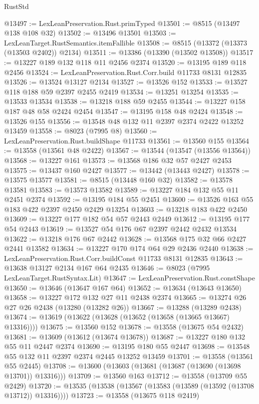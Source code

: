 \begin{lexlean}{RustStd}
\begin{coremodule}
@13497 := LexLeanPreservation.Rust.primTyped
@13501 := @8515 (@13497 @138 @108 @32)
@13502 := @13496 @13501
@13503 := LexLeanTarget.RustSemantics.itemFallible
@13508 := @8515 (@13372 (@13373 (@13503 @2402)) @2134)
@13511 := @13386 (@13390 (@13502 @13508))
@13517 := @13227 @189 @132 @118 @11 @2456 @2374
@13520 := @13195 @189 @118 @2456
@13524 := LexLeanPreservation.Rust.Corr.build @11733 @8131 @12835
@13526 := @13524 @13127 @2134
@13527 := @13526 @152
@13533 := @13527 @118 @188 @59 @2397 @2455 @2419
@13534 := @13251 @13254
@13535 := @13533 @13534
@13538 := @13218 @188 @59 @2455
@13544 := @13227 @158 @187 @48 @58 @2424 @2454
@13547 := @13195 @158 @48 @2424
@13548 := @13526 @155
@13556 := @13548 @48 @132 @11 @2397 @2374 @2422 @13252 @13459
@13558 := @8023 (@7995 @8)
@13560 := LexLeanPreservation.Rust.buildShape @11733
@13561 := @13560 @155
@13564 := @13558 (@13561 @48 @2422)
@13567 := @13544 (@13547 (@13556 @13564))
@13568 := @13227 @161
@13573 := @13568 @186 @32 @57 @2427 @2453
@13575 := @13437 @160 @2427
@13577 := @13442 (@13443 @2427)
@13578 := @13575 @13577
@13581 := @8515 (@13448 @160 @32)
@13582 := @13578 @13581
@13583 := @13573 @13582
@13589 := @13227 @184 @132 @55 @11 @2451 @2374
@13592 := @13195 @184 @55 @2451
@13600 := @13526 @163 @55 @183 @422 @2397 @2450 @2429 @13254
@13603 := @13218 @183 @422 @2450
@13609 := @13227 @177 @182 @54 @57 @2443 @2449
@13612 := @13195 @177 @54 @2443
@13619 := @13527 @54 @176 @67 @2397 @2442 @2432 @13534
@13622 := @13218 @176 @67 @2442
@13628 := @13568 @175 @32 @66 @2427 @2441 @13582
@13634 := @13227 @170 @174 @64 @29 @2436 @2440
@13638 := LexLeanPreservation.Rust.Corr.buildConst @11733 @8131 @12835
@13643 := @13638 @13127 @2134 @167 @64 @2435
@13646 := @8023 (@7995 LexLeanTarget.RustSyntax.Lit)
@13647 := LexLeanPreservation.Rust.constShape
@13650 := @13646 (@13647 @167 @64)
@13652 := @13634 (@13643 @13650)
@13658 := @13227 @172 @132 @27 @11 @2438 @2374
@13665 := @13274 @26 @27 @26 @2438 (@13280 (@13282 @26))
@13667 := @13288 (@13289 @2438)
@13674 := @13619 (@13622 (@13628 (@13652 (@13658 (@13665 @13667) @13316))))
@13675 := @13560 @152
@13678 := @13558 (@13675 @54 @2432)
@13681 := @13609 (@13612 (@13674 @13678))
@13687 := @13227 @180 @132 @55 @11 @2447 @2374
@13690 := @13195 @180 @55 @2447
@13698 := @13548 @55 @132 @11 @2397 @2374 @2445 @13252 @13459
@13701 := @13558 (@13561 @55 @2445)
@13708 := @13600 (@13603 (@13681 (@13687 (@13690 (@13698 @13701)) @13316)))
@13709 := @13560 @163
@13712 := @13558 (@13709 @55 @2429)
@13720 := @13535 (@13538 (@13567 (@13583 (@13589 (@13592 (@13708 @13712)) @13316))))
@13723 := @13558 (@13675 @118 @2419)

\end{coremodule}
\end{lexlean}
